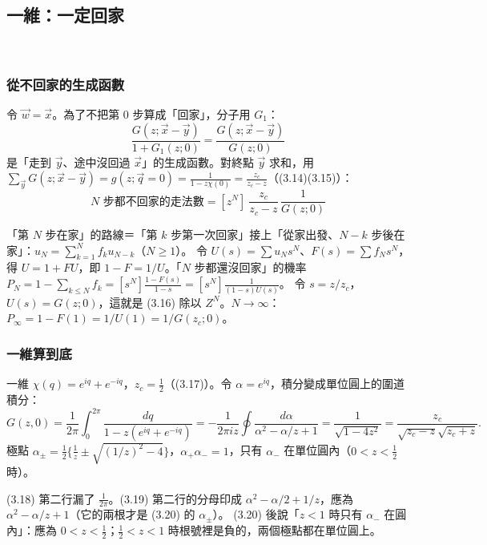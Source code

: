 \subsection{一維：一定回家}
\ 

\subsubsection{從不回家的生成函數}
令 $\vec w=\vec x$。為了不把第 0 步算成「回家」，分子用 $G_1$：
\[\frac{G(z;\vec x-\vec y)}{1+G_1(z;0)}=\frac{G(z;\vec x-\vec y)}{G(z;0)}\tag{3.12}\]
是「走到 $\vec y$、途中沒回過 $\vec x$」的生成函數。對終點 $\vec y$ 求和，用 $\sum_{\vec y}G(z;\vec x-\vec y)=g(z;\vec q=0)=\frac{1}{1-z\chi(0)}=\frac{z_c}{z_c-z}$（(3.14)(3.15)）：
\[\boxed{\ \text{$N$ 步都不回家的走法數}=[z^N]\ \frac{z_c}{z_c-z}\,\frac{1}{G(z;0)}\ }\tag{3.16}\]

\begin{notebox}
「第 $N$ 步在家」的路線＝「第 $k$ 步第一次回家」接上「從家出發、$N-k$ 步後在家」：$u_N=\sum_{k=1}^{N}f_ku_{N-k}$（$N\ge1$）。
令 $U(s)=\sum u_Ns^N$、$F(s)=\sum f_Ns^N$，得 $U=1+FU$，即 $1-F=1/U$。「$N$ 步都還沒回家」的機率 $P_N=1-\sum_{k\le N}f_k=[s^N]\frac{1-F(s)}{1-s}=[s^N]\frac{1}{(1-s)U(s)}$。
令 $s=z/z_c$，$U(s)=G(z;0)$，這就是 (3.16) 除以 $Z^N$。$N\to\infty$：$P_\infty=1-F(1)=1/U(1)=1/G(z_c;0)$。
\end{notebox}

\subsubsection{一維算到底}
一維 $\chi(q)=e^{iq}+e^{-iq}$，$z_c=\frac12$（(3.17)）。令 $\alpha=e^{iq}$，積分變成單位圓上的圍道積分：
\[G(z,0)=\frac{1}{2\pi}\int_0^{2\pi}\frac{dq}{1-z(e^{iq}+e^{-iq})}=-\frac{1}{2\pi iz}\oint\frac{d\alpha}{\alpha^2-\alpha/z+1}
=\frac{1}{\sqrt{1-4z^2}}=\frac{z_c}{\sqrt{z_c-z}\sqrt{z_c+z}}.\tag{3.18--3.21}\]
極點 $\alpha_\pm=\frac12\{\frac1z\pm\sqrt{(1/z)^2-4}\}$，$\alpha_+\alpha_-=1$，只有 $\alpha_-$ 在單位圓內（$0<z<\frac12$ 時）。
\begin{errbox}[p.~56--57，(3.18)--(3.20)]
(3.18) 第二行漏了 $\frac{1}{2\pi}$。(3.19) 第二行的分母印成 $\alpha^2-\alpha/2+1/z$，應為 $\alpha^2-\alpha/z+1$（它的兩根才是 (3.20) 的 $\alpha_\pm$）。
(3.20) 後說「$z<1$ 時只有 $\alpha_-$ 在圓內」：應為 $0<z<\frac12$；$\frac12<z<1$ 時根號裡是負的，兩個極點都在單位圓上。
\end{errbox}


